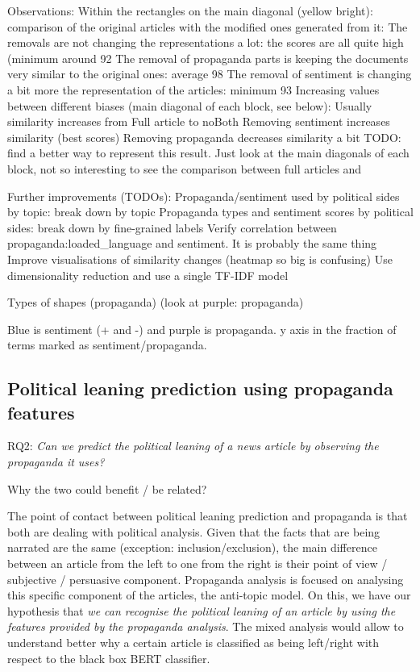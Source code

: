 Observations:
Within the rectangles on the main diagonal (yellow bright): comparison of the original articles with the modified ones generated from it:
The removals are not changing the representations a lot: the scores are all quite high (minimum around 92%
The removal of propaganda parts is keeping the documents very similar to the original ones: average 98%
The removal of sentiment is changing a bit more the representation of the articles: minimum 93%
Increasing values between different biases (main diagonal of each block, see below):
Usually similarity increases from Full article to noBoth
Removing sentiment increases similarity (best scores)
Removing propaganda decreases similarity a bit
TODO: find a better way to represent this result. Just look at the main diagonals of each block, not so interesting to see the comparison between full articles and 

Further improvements (TODOs):
Propaganda/sentiment used by political sides by topic: break down by topic
Propaganda types and sentiment scores by political sides: break down by fine-grained labels
Verify correlation between propaganda:loaded\_language and sentiment. It is probably the same thing
Improve visualisations of similarity changes (heatmap so big is confusing)
Use dimensionality reduction and use a single TF-IDF model



Types of shapes (propaganda)
(look at purple: propaganda)

Blue is sentiment (+ and -) and purple is propaganda. 
y axis in the fraction of terms marked as sentiment/propaganda.



\subsection{\statusorange Political leaning prediction using propaganda features}



RQ2: \emph{Can we predict the political leaning of a news article by observing the propaganda it uses?}

Why the two could benefit / be related?

The point of contact between political leaning prediction and propaganda is that both are dealing with political analysis.
Given that the facts that are being narrated are the same (exception: inclusion/exclusion), the main difference between an article from the left to one from the right is their point of view / subjective / persuasive component. Propaganda analysis is focused on analysing this specific component of the articles, the anti-topic model.
On this, we have our hypothesis that \emph{we can recognise the political leaning of an article by using the features provided by the propaganda analysis}.
The mixed analysis would allow to understand better why a certain article is classified as being left/right with respect to the black box BERT classifier.

